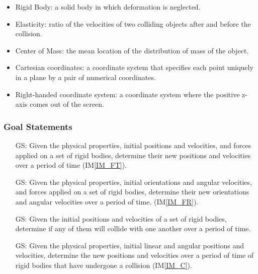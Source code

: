 \documentclass[12pt]{article}
\newcounter{goalnum} %
\begin{document}
\begin{itemize}

\item Rigid Body: a solid body in which deformation is neglected.
\item Elasticity: ratio of the velocities of two colliding objects after and
before the collision.
\item Center of Mass: the mean location of the distribution of mass of the object.
\item  Cartesian coordinates: a coordinate system that specifies each point uniquely in a plane by a pair of numerical coordinates.
\item  Right-handed coordinate system: a coordinate system where the positive z-axis comes out of the screen.

\end{itemize}

\subsubsection{Goal Statements}

\begin{itemize}
	
\item[GS\refstepcounter{goalnum}\thegoalnum \label{G_linear}:] Given the physical properties, initial positions and velocities, and forces applied on a set of rigid bodies, determine their new positions and velocities over a period of time (IM\ref{IM_FT}).

\item[GS\refstepcounter{goalnum}\thegoalnum \label{G_angular}:] Given the physical properties, initial orientations and angular velocities, and forces applied on a set of rigid bodies, determine their new orientations and angular velocities over a period of time. (IM\ref{IM_FR}).

\item[GS\refstepcounter{goalnum}\thegoalnum  \label{G_detectCollision}:] Given the initial positions and
velocities of a set of rigid bodies, determine if any of them will collide with one another over a period of time.

\item[GS\refstepcounter{goalnum}\thegoalnum  \label{G_collision}:] Given the physical properties, initial linear and angular positions and velocities, determine the new positions and velocities over a period of time of rigid bodies that have undergone a collision (IM\ref{IM_C}).

\end{itemize}
\end{document}
